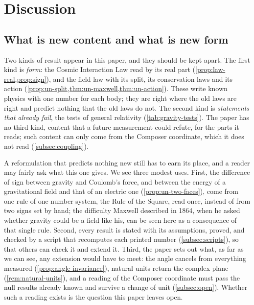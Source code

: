 \section{Discussion}\label{sec:discussion}

\subsection{What is new content and what is new form}\label{subsec:content-form}

Two kinds of result appear in this paper, and they should be kept apart. The first kind is \emph{form}: the Cosmic Interaction Law read by its real part (\cref{prop:law-real,prop:sign}), and the field law with its split, its conservation laws and its action (\cref{prop:un-split,thm:un-maxwell,thm:un-action}). These write known physics with one number for each body; they are right where the old laws are right and predict nothing that the old laws do not. The second kind is \emph{statements that already fail}, the tests of general relativity (\cref{tab:gravity-tests}). The paper has no third kind, content that a future measurement could refute, for the parts it reads; such content can only come from the Composer coordinate, which it does not read (\cref{subsec:coupling}).

A reformulation that predicts nothing new still has to earn its place, and a reader may fairly ask what this one gives. We see three modest uses. First, the difference of sign between gravity and Coulomb's force, and between the energy of a gravitational field and that of an electric one (\cref{prop:un-two-faces}), come from one rule of one number system, the Rule of the Square, read once, instead of from two signs set by hand; the difficulty Maxwell described in 1864, when he asked whether gravity could be a field like his, can be seen here as a consequence of that single rule. Second, every result is stated with its assumptions, proved, and checked by a script that recomputes each printed number (\cref{subsec:scripts}), so that others can check it and extend it. Third, the paper sets out what, as far as we can see, any extension would have to meet: the angle cancels from everything measured (\cref{prop:angle-invariance}), natural units return the complex plane (\cref{rem:natural-units}), and a reading of the Composer coordinate must pass the null results already known and survive a change of unit (\cref{subsec:open}). Whether such a reading exists is the question this paper leaves open.


